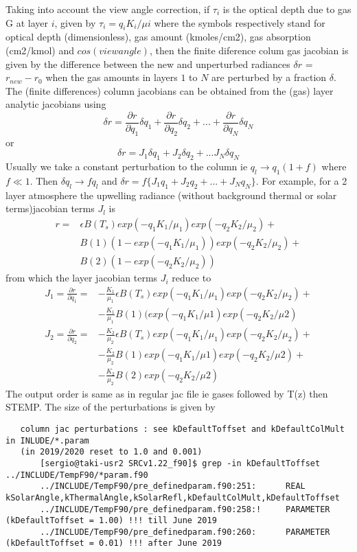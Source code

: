 \documentclass[12pt]{article}
\begin{document}
Taking into account the view angle correction, if $\tau_{i}$ is the optical 
depth due to gas G at layer $i$, given by $\tau_{i} = q_{i} K_{i}/\mu{i}$ 
where the symbols respectively stand for optical depth (dimensionless), gas 
amount (kmoles/cm2), gas absorption (cm2/kmol) and $cos(view angle)$, then 
the finite diference colum gas jacobian is 
given by the difference between the new and unperturbed radiances 
$\delta r$ = $r_{new} - r_{0}$ when the gas amounts in layers $1$ to $N$ are 
perturbed by a fraction $\delta$. The (finite differences) column jacobians 
can be obtained from the (gas) layer analytic jacobians using
\[
\delta r = \frac{\partial r}{\partial q_1} \delta q_1 + 
           \frac{\partial r}{\partial q_2} \delta q_2 + ... + 
           \frac{\partial r}{\partial q_N} \delta q_N
\] 
or 
\[
\delta r = J_{1} \delta q_1 + J_{2} \delta q_2 + ...
               J_{N} \delta q_N
\]
Usually we take a constant perturbation to the column ie $q_{l} \rightarrow 
q_{1}(1 + f)$ where $f \ll 1$. Then $\delta q_{l} \rightarrow f q_{l}$ and
$\delta r = f \{ J_{1} q_1 + J_{2} q_2 + ... + J_{N} q_N \} $. For example, 
for a 2 layer atmosphere the upwelling radiance (without background thermal 
or solar terms)jacobian terms $J_{l}$ is 
\begin{eqnarray*}
r = & \epsilon B(T_{s}) exp(-q_{1} K_{1}/\mu_{1})exp(-q_{2} K_{2}/\mu_{2}) +\\
    & B(1)(1-exp(-q_{1} K_{1}/\mu_{1}))exp(-q_{2} K_{2}/\mu_{2}) + \\
    & B(2)(1-exp(-q_{2} K_{2}/\mu_{2}))
\end{eqnarray*}
from which the layer jacobian terms $J_{i}$ reduce to
\begin{eqnarray*}
J_{1} = \frac{\partial r}{\partial q_1} = & 
 -\frac{K_1}{\mu_1}\epsilon B(T_{s})exp(-q_1 K_1/\mu_1)exp(-q_2 K_2/\mu_2) + \\
&-\frac{K_1}{\mu_1} B(1)(exp(-q_{1} K_{1}/\mu{1})exp(-q_{2} K_{2}/\mu{2})
\end{eqnarray*}
\begin{eqnarray*}
J_{2} = \frac{\partial r}{\partial q_2} = & 
-\frac{K_2}{\mu_2}\epsilon B(T_{s})exp(-q_1 K_1/\mu_1)exp(-q_2 K_2/\mu_2) + \\
& -\frac{K_2}{\mu_2} B(1)exp(-q_{1} K_{1}/\mu{1})exp(-q_{2} K_{2}/\mu{2}) + \\
& -\frac{K_2}{\mu_2} B(2)exp(-q_{2} K_{2}/\mu{2})
\end{eqnarray*}
The output order is same as in regular jac file ie gases followed by T(z) then STEMP.
The size of the perturbations is given by
\begin{verbatim}
   column jac perturbations : see kDefaultToffset and kDefaultColMult in INLUDE/*.param
   (in 2019/2020 reset to 1.0 and 0.001)
       [sergio@taki-usr2 SRCv1.22_f90]$ grep -in kDefaultToffset ../INCLUDE/TempF90/*param.f90
       ../INCLUDE/TempF90/pre_definedparam.f90:251:      REAL kSolarAngle,kThermalAngle,kSolarRefl,kDefaultColMult,kDefaultToffset
       ../INCLUDE/TempF90/pre_definedparam.f90:258:!     PARAMETER (kDefaultToffset = 1.00) !!! till June 2019
       ../INCLUDE/TempF90/pre_definedparam.f90:260:      PARAMETER (kDefaultToffset = 0.01) !!! after June 2019
\end{verbatim}
\end{document}
